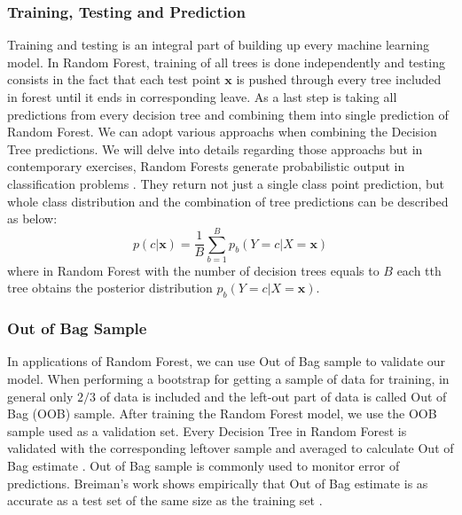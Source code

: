 \subsubsection{Training, Testing and Prediction}\label{tra_test_pred}
Training and testing is an integral part of building up every machine learning model.
In Random Forest, training of all trees is done independently and testing consists in the fact that each test point $\textbf{x}$ is pushed 
through every tree included in forest until it ends in corresponding leave. As a last step is taking all predictions from 
every decision tree and combining them into single prediction of Random Forest. 
We can adopt various approachs when combining the Decision Tree predictions. We will delve into details regarding those approachs but in contemporary exercises, Random Forests generate probabilistic output in classification problems \cite{CGV-035}. 
They return not just a single class point prediction, but whole class distribution and the combination of tree predictions can be described as below:
\begin{equation}
	p(c|\textbf{x}) =  \frac{1}{B} \displaystyle\sum_{b=1}^{B} p_{b}(Y = c |X = \textbf{x})
\end{equation}
where in Random Forest with the number of decision trees equals to $B$ each tth tree obtains the posterior 
distribution $ p_{b}(Y = c |X = \textbf{x}) $.

\subsubsection{Out of Bag Sample}
In applications of Random Forest, we can use Out of Bag sample to validate our model.
When performing a bootstrap for getting a sample of data for training, in general only $2/3$ of data is included and the
left-out part of data is called Out of Bag (OOB) sample.
After training the Random Forest model, we use the OOB sample used as a validation set. 
Every Decision Tree in Random Forest is validated with the corresponding leftover sample 
and averaged to calculate Out of Bag estimate \cite{friedman2001elements}. 
Out of Bag sample is commonly used to monitor error of predictions. 
Breiman’s work \cite{Breiman1996OUT-OF-BAG-E} shows empirically that Out of Bag estimate is as accurate 
as a test set of the same size as the training set \cite{Breiman1996OUT-OF-BAG-E}.

